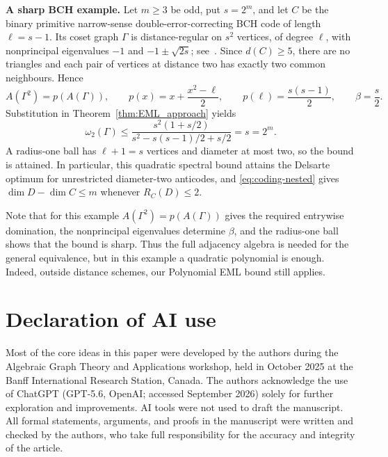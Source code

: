 \documentclass[10pt,a4paper]{article}
\theoremstyle{plain}
\numberwithin{equation}{section}
\begin{document}
\medskip
\textbf{A sharp BCH example.}
Let $m\ge3$ be odd, put $s=2^m$, and let $C$ be the binary primitive
narrow-sense double-error-correcting BCH code of length $\ell=s-1$.
Its coset graph $\Gamma$ is distance-regular on $s^2$ vertices, of degree
$\ell$, with nonprincipal eigenvalues
$-1$ and $-1\pm\sqrt{2s}$; see~\cite{vanDam_FonderFlaass_2000}.
Since $d(C)\ge5$, there are no triangles and each pair of vertices at
distance two has exactly two common neighbours. Hence
\[
 A(\Gamma^2)=p(A(\Gamma)),\qquad
 p(x)=x+\frac{x^2-\ell}{2},\qquad
 p(\ell)=\frac{s(s-1)}2,\qquad \beta=\frac s2.
\]
Substitution in Theorem~\ref{thm:EML_approach} yields
\begin{equation}\label{eq:coding-bch}
 \omega_2(\Gamma)\le
 \frac{s^2(1+s/2)}{s^2-s(s-1)/2+s/2}=s=2^m.
\end{equation}
A radius-one ball has $\ell+1=s$ vertices and diameter at most two, so
the bound is attained. In particular, this quadratic spectral bound attains the Delsarte optimum for unrestricted diameter-two
anticodes, and \eqref{eq:coding-nested} gives
$\dim D-\dim C\le m$ whenever $R_C(D)\le2$.



Note that for this example $A(\Gamma^2)=p(A(\Gamma))$ gives the required entrywise domination, the nonprincipal eigenvalues determine $\beta$, and the radius-one ball shows that the bound is sharp. Thus the full adjacency algebra is needed for the general equivalence, but in this example a quadratic polynomial is enough. Indeed, outside distance schemes, our Polynomial EML bound still applies.%


 
\section*{Declaration of AI use}
Most of the core ideas in this paper were developed by the authors during the Algebraic Graph Theory and Applications workshop, held in  
October 2025 at the 
Banff International Research Station, Canada. The authors acknowledge the use of ChatGPT (GPT-5.6, OpenAI; accessed September 2026) solely for further exploration and improvements. AI tools were not used to draft the manuscript. All formal statements, arguments, and proofs in the manuscript were written and checked by the authors, who take full responsibility for the accuracy and integrity of the article. 
\end{document}
